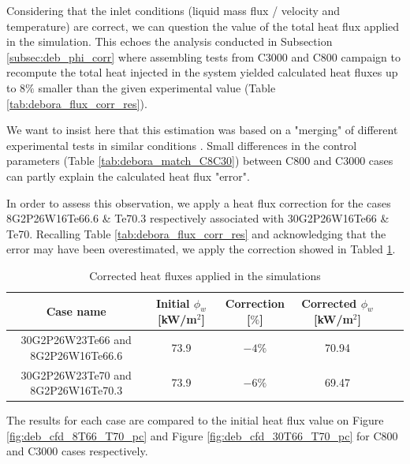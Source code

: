 \npar

Considering that the inlet conditions (liquid mass flux / velocity and temperature) are correct, we can question the value of the total heat flux applied in the simulation. This echoes the analysis conducted in Subsection \ref{subsec:deb_phi_corr} where assembling tests from C3000 and C800 campaign to recompute the total heat injected in the system yielded calculated heat fluxes up to $8\%$ smaller than the given experimental value (Table \ref{tab:debora_flux_corr_res}).

\begin{note*}
We want to insist here that this estimation was based on a "merging" of different experimental tests in similar conditions . Small differences in the control parameters (Table \ref{tab:debora_match_C8C30}) between C800 and C3000 cases can partly explain the calculated heat flux "error".
\end{note*}

\npar

In order to assess this observation, we apply a heat flux correction for the cases 8G2P26W16Te66.6 \& Te70.3 respectively associated with 30G2P26W16Te66 \& Te70. Recalling  Table \ref{tab:debora_flux_corr_res} and acknowledging that the error may have been overestimated, we apply the correction showed in Tabled \ref{tab:debora_cfd_phicorr}.
 





\begin{table}[!h]
\centering

\begin{tabular}{c||c|c|c|c|c}
Case name & Initial $\phi_{w}$ [kW/m$^{2}$] & Correction [$\%$] & Corrected $\phi_{w}$ [kW/m$^{2}$]\\
\hline
\hline
30G2P26W23Te66 and 8G2P26W16Te66.6 & 73.9 & $-4\%$ & 70.94 \\
\hline
30G2P26W23Te70 and 8G2P26W16Te70.3 & 73.9 & $-6\%$ & 69.47 \\
\end{tabular}

\caption{Corrected heat fluxes applied in the simulations}
\label{tab:debora_cfd_phicorr}

\end{table}

\npar

The results for each case are compared to the initial heat flux value on Figure \ref{fig:deb_cfd_8T66_T70_pc} and Figure \ref{fig:deb_cfd_30T66_T70_pc} for C800 and C3000 cases respectively.


